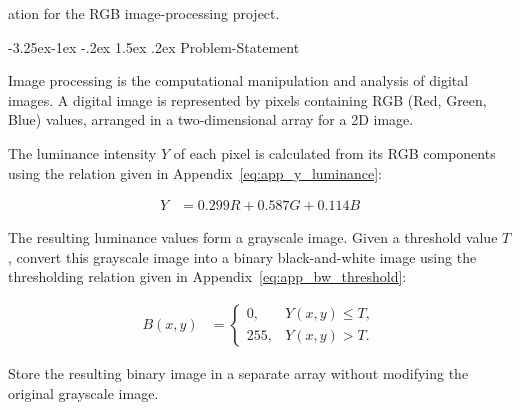 ation for the RGB image-processing project.

\renewcommand{\thesubsection}{\arabic{section}.\arabic{subsection}}

\makeatletter
\renewcommand{\@seccntformat}[1]{\csname the#1\endcsname\quad}
\renewcommand{\subsection}{%
  \@startsection{subsection}{2}{\z@}%
  {-3.25ex\@plus -1ex \@minus -.2ex}%
  {1.5ex \@plus .2ex}%
  {\normalfont\normalsize\bfseries}}
\makeatother

\subsection{Problem-Statement}

Image processing is the computational manipulation and analysis of digital images. A digital image is represented by pixels containing RGB (Red, Green, Blue) values, arranged in a two-dimensional array for a 2D image.

The luminance intensity $Y$ of each pixel is calculated from its RGB components using the relation given in Appendix~\eqref{eq:app_y_luminance}:

\renewcommand{\theequation}{\arabic{section}.\arabic{subsection}.\arabic{equation}}
\setcounter{equation}{0}

\begin{align}
Y &= 0.299R + 0.587G + 0.114B
\label{eq:problem_y_luminance}
\end{align}

The resulting luminance values form a grayscale image. Given a threshold value $T$, convert this grayscale image into a binary black-and-white image using the thresholding relation given in Appendix~\eqref{eq:app_bw_threshold}:

\begin{align}
B(x,y) &=
\begin{cases}
0, & Y(x,y) \leq T,\\
255, & Y(x,y) > T.
\end{cases}
\label{eq:problem_bw_threshold}
\end{align}

Store the resulting binary image in a separate array without modifying the original grayscale image.

